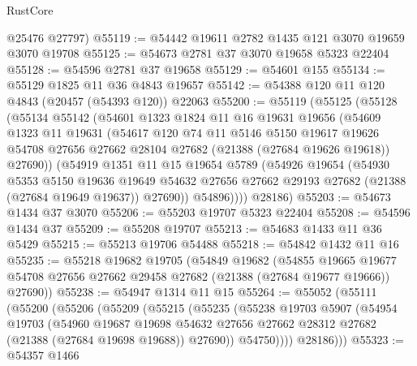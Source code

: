 \begin{lexlean}{RustCore}
\begin{coremodule}
      @25476
      @27797)
@55119 := @54442 @19611 @2782 @1435 @121 @3070 @19659 @3070 @19708
@55125 := @54673 @2781 @37 @3070 @19658 @5323 @22404
@55128 := @54596 @2781 @37 @19658
@55129 := @54601 @155
@55134 := @55129 @1825 @11 @36 @4843 @19657
@55142 := @54388 @120 @11 @120 @4843 (@20457 (@54393 @120)) @22063
@55200 := @55119
    (@55125
      (@55128
        (@55134
          @55142
          (@54601
            @1323
            @1824
            @11
            @16
            @19631
            @19656
            (@54609
              @1323
              @11
              @19631
              (@54617
                @120
                @74
                @11
                @5146
                @5150
                @19617
                @19626
                @54708
                @27656
                @27662
                @28104
                @27682
                (@21388 (@27684 @19626 @19618))
                @27690))
            (@54919
              @1351
              @11
              @15
              @19654
              @5789
              (@54926
                @19654
                (@54930
                  @5353
                  @5150
                  @19636
                  @19649
                  @54632
                  @27656
                  @27662
                  @29193
                  @27682
                  (@21388 (@27684 @19649 @19637))
                  @27690))
              @54896))))
      @28186)
@55203 := @54673 @1434 @37 @3070
@55206 := @55203 @19707 @5323 @22404
@55208 := @54596 @1434 @37
@55209 := @55208 @19707
@55213 := @54683 @1433 @11 @36 @5429
@55215 := @55213 @19706 @54488
@55218 := @54842 @1432 @11 @16
@55235 := @55218
    @19682
    @19705
    (@54849
      @19682
      (@54855
        @19665
        @19677
        @54708
        @27656
        @27662
        @29458
        @27682
        (@21388 (@27684 @19677 @19666))
        @27690))
@55238 := @54947 @1314 @11 @15
@55264 := @55052
    (@55111
      (@55200
        (@55206
          (@55209
            (@55215
              (@55235
                (@55238
                  @19703
                  @5907
                  (@54954
                    @19703
                    (@54960
                      @19687
                      @19698
                      @54632
                      @27656
                      @27662
                      @28312
                      @27682
                      (@21388 (@27684 @19698 @19688))
                      @27690))
                  @54750))))
          @28186)))
@55323 := @54357
    @1466

\end{coremodule}
\end{lexlean}
